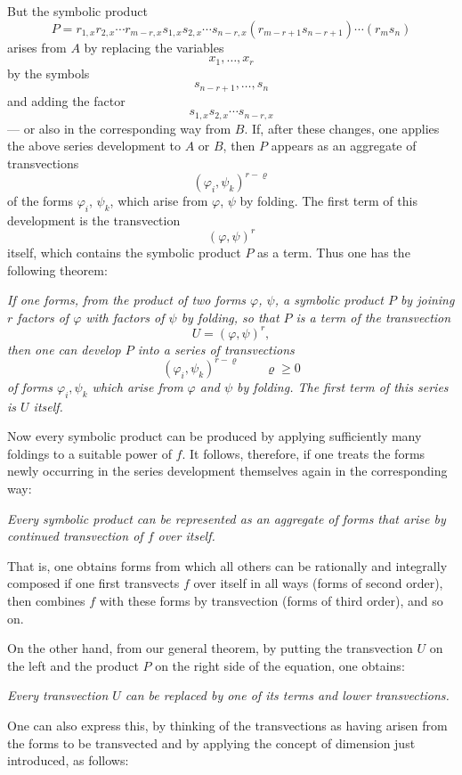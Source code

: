 \documentclass[10pt]{article}
\begin{document}
But the symbolic product
\[
P=r_{1,x}r_{2,x}\cdots r_{m-r,x}s_{1,x}s_{2,x}\cdots s_{n-r,x}(r_{m-r+1}s_{n-r+1})\cdots(r_ms_n)
\]
arises from $A$ by replacing the variables
\[
x_1,\ldots,x_r
\]
by the symbols
\[
s_{n-r+1},\ldots,s_n
\]
and adding the factor
\[
s_{1,x}s_{2,x}\cdots s_{n-r,x}
\]
--- or also in the corresponding way from $B$. If, after these changes, one applies the above series development to $A$ or $B$, then $P$ appears as an aggregate of transvections
\[
(\varphi_i,\psi_k)^{r-\varrho}
\]
of the forms $\varphi_i$, $\psi_k$, which arise from $\varphi$, $\psi$ by folding. The first term of this development is the transvection
\[
(\varphi,\psi)^r
\]
itself, which contains the symbolic product $P$ as a term. Thus one has the following theorem:

\emph{If one forms, from the product of two forms $\varphi$, $\psi$, a symbolic product $P$ by joining $r$ factors of $\varphi$ with factors of $\psi$ by folding, so that $P$ is a term of the transvection}
\[
U=(\varphi,\psi)^r,
\]
\emph{then one can develop $P$ into a series of transvections}
\[
(\varphi_i,\psi_k)^{r-\varrho}\qquad \varrho\geq0
\]
\emph{of forms $\varphi_i,\psi_k$ which arise from $\varphi$ and $\psi$ by folding. The first term of this series is $U$ itself.}

Now every symbolic product can be produced by applying sufficiently many foldings to a suitable power of $f$. It follows, therefore, if one treats the forms newly occurring in the series development themselves again in the corresponding way:

\emph{Every symbolic product can be represented as an aggregate of forms that arise by continued transvection of $f$ over itself.}

That is, one obtains forms from which all others can be rationally and integrally composed if one first transvects $f$ over itself in all ways (forms of second order), then combines $f$ with these forms by transvection (forms of third order), and so on.

On the other hand, from our general theorem, by putting the transvection $U$ on the left and the product $P$ on the right side of the equation, one obtains:

\emph{Every transvection $U$ can be replaced by one of its terms and lower transvections.}

One can also express this, by thinking of the transvections as having arisen from the forms to be transvected and by applying the concept of dimension just introduced, as follows:
\end{document}
